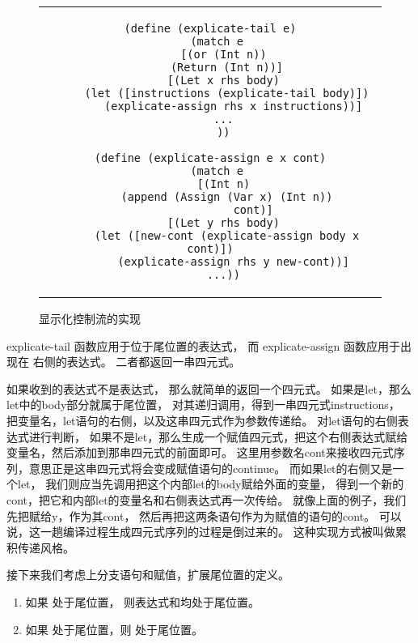 \begin{figure}[t]
\begin{center}
\vspace{0.4em}
\begin{tabular}{c}
\begin{lstlisting}
(define (explicate-tail e)
  (match e
    [(or (Int n))
     (Return (Int n))]
    [(Let x rhs body)
     (let ([instructions (explicate-tail body)])
       (explicate-assign rhs x instructions))]
    ...
    ))

(define (explicate-assign e x cont)
  (match e
    [(Int n)
     (append (Assign (Var x) (Int n))
             cont)]
    [(Let y rhs body)
     (let ([new-cont (explicate-assign body x cont)])
       (explicate-assign rhs y new-cont))]
    ...))
\end{lstlisting}
\end{tabular}
\vspace{0.8em}
\end{center}

    \caption{显示化控制流的实现}
    \label{fig:explicate-control-implementation}
\end{figure}
\begin{multilinecode}
\end{multilinecode}

explicate-tail 函数应用于位于尾位置的表达式，
而 explicate-assign 函数应用于出现在  右侧的表达式。
二者都返回一串四元式。

如果收到的表达式不是表达式，
那么就简单的返回一个四元式。
如果是let，那么let中的body部分就属于尾位置，
对其递归调用，得到一串四元式instructions，
把变量名，let语句的右侧，以及这串四元式作为参数传递给。
对let语句的右侧表达式进行判断，
如果不是let，那么生成一个赋值四元式，把这个右侧表达式赋给变量名，然后添加到那串四元式的前面即可。
这里用参数名cont来接收四元式序列，意思正是这串四元式将会变成赋值语句的continue。
而如果let的右侧又是一个let，
我们则应当先调用把这个内部let的body赋给外面的变量，
得到一个新的cont，把它和内部let的变量名和右侧表达式再一次传给。
就像上面的例子，我们先把赋给y，作为其cont，
然后再把这两条语句作为为赋值的语句的cont。
可以说，这一趟编译过程生成四元式序列的过程是倒过来的。
这种实现方式被叫做累积传递风格。

接下来我们考虑上分支语句和赋值，扩展尾位置的定义。
\begin{enumerate}
\item 如果  处于尾位置，
  则表达式和均处于尾位置。
\item 如果 处于尾位置，则 处于尾位置。
\end{enumerate}

